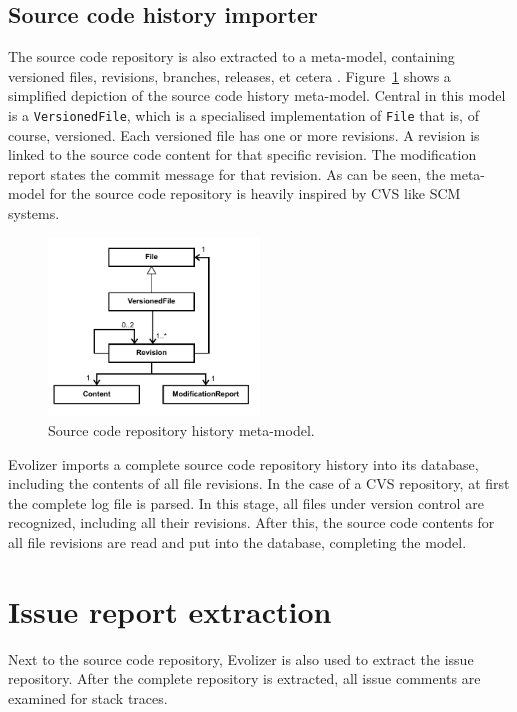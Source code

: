 \subsection{Source code history importer} %
\label{sub:source_code_history_importer}
The source code repository is also extracted to a meta-model, containing versioned files, revisions, branches, releases, et cetera \cite{Fischer}. Figure~\ref{fig:source_code_repository_metamodel} shows a simplified depiction of the source code history meta-model. Central in this model is a \texttt{VersionedFile}, which is a specialised implementation of \texttt{File} that is, of course, versioned. Each versioned file has one or more revisions. A revision is linked to the source code content for that specific revision. The modification report states the commit message for that revision. As can be seen, the meta-model for the source code repository is heavily inspired by CVS like SCM systems. 

\begin{figure}[!ht]
	\centering
		\includegraphics[width=0.5\textwidth]{img/version_history_model.pdf}
	\caption{Source code repository history meta-model.}
	\label{fig:source_code_repository_metamodel}
\end{figure}

Evolizer imports a complete source code repository history into its database, including the contents of all file revisions. In the case of a CVS repository, at first the complete log file is parsed. In this stage, all files under version control are recognized, including all their revisions. After this, the source code contents for all file revisions are read and put into the database, completing the model.
 

\section{Issue report extraction} %
\label{sub:issue_report_extraction}
Next to the source code repository, Evolizer is also used to extract the issue repository. After the complete repository is extracted, all issue comments are examined for stack traces.

